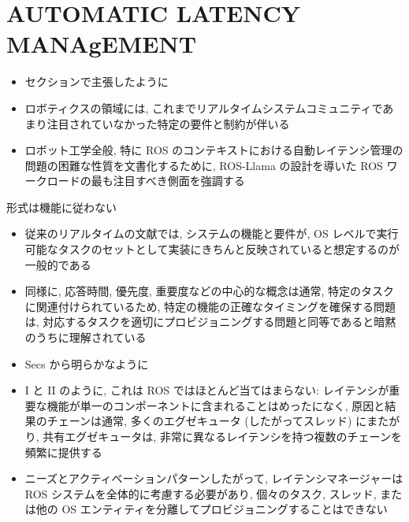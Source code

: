 
\section{AUTOMATIC LATENCY MANAgEMENT}
\label{sec: automatic latency management}

\begin{frame}{}
    \begin{itemize}
        \item セクションで主張したように
\item ロボティクスの領域には, これまでリアルタイムシステムコミュニティであまり注目されていなかった特定の要件と制約が伴いる
\item ロボット工学全般, 特に ROS のコンテキストにおける自動レイテンシ管理の問題の困難な性質を文書化するために, ROS-Llama の設計を導いた ROS ワークロードの最も注目すべき側面を強調する
    \end{itemize}
\end{frame}

\begin{frame}{形式は機能に従わない}
    \begin{itemize}
        \item 従来のリアルタイムの文献では, システムの機能と要件が, OS レベルで実行可能なタスクのセットとして実装にきちんと反映されていると想定するのが一般的である
\item 同様に, 応答時間, 優先度, 重要度などの中心的な概念は通常, 特定のタスクに関連付けられているため, 特定の機能の正確なタイミングを確保する問題は, 対応するタスクを適切にプロビジョニングする問題と同等であると暗黙のうちに理解されている
    \end{itemize}
\end{frame}

\begin{frame}{}
    \begin{itemize}
        \item Secs から明らかなように
\item I と II のように, これは ROS ではほとんど当てはまらない: レイテンシが重要な機能が単一のコンポーネントに含まれることはめったになく, 原因と結果のチェーンは通常, 多くのエグゼキュータ (したがってスレッド) にまたがり, 共有エグゼキュータは, 非常に異なるレイテンシを持つ複数のチェーンを頻繁に提供する
\item ニーズとアクティベーションパターンしたがって, レイテンシマネージャーは ROS システムを全体的に考慮する必要があり, 個々のタスク, スレッド, または他の OS エンティティを分離してプロビジョニングすることはできない
    \end{itemize}
\end{frame}

